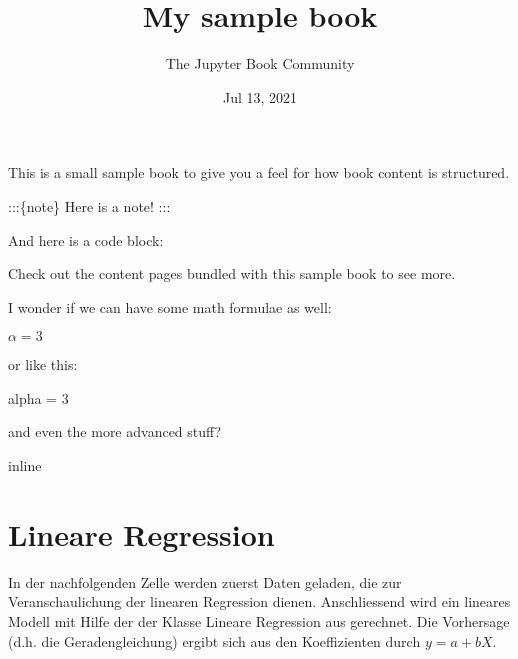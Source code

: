 \documentclass[letterpaper,10pt,english]{jupyterBook}
\title{My sample book}
\date{Jul 13, 2021}
\author{The Jupyter Book Community}
\begin{document}
\pagestyle{empty}
\sphinxmaketitle
\pagestyle{plain}
\sphinxtableofcontents
\pagestyle{normal}
\label{\detokenize{intro::doc}}


\sphinxAtStartPar
This is a small sample book to give you a feel for how book content is
structured.

\sphinxAtStartPar
:::\{note\}
Here is a note!
:::

\sphinxAtStartPar
And here is a code block:

\begin{sphinxVerbatim}[commandchars=\\\{\}]
  
\end{sphinxVerbatim}

\sphinxAtStartPar
Check out the content pages bundled with this sample book to see more.

\sphinxAtStartPar
I wonder if we can have some math formulae as well:

\sphinxAtStartPar
\(\alpha = 3\)

\sphinxAtStartPar
or like this:

\begin{sphinxVerbatim}[commandchars=\\\{\}]
\PYGZdl{}\PYGZbs{}alpha = 3\PYGZdl{}
\end{sphinxVerbatim}

\sphinxAtStartPar
and even the more advanced stuff?

\begin{sphinxVerbatim}[commandchars=\\\{\}]
   
 inline
\end{sphinxVerbatim}


\chapter{Lineare Regression}
\label{\detokenize{Regression_Techniques:lineare-regression}}\label{\detokenize{Regression_Techniques::doc}}
\sphinxAtStartPar
In der nachfolgenden Zelle werden zuerst Daten geladen, die zur Veranschaulichung der linearen Regression dienen.
Anschliessend wird ein lineares Modell mit Hilfe der der Klasse Lineare Regression aus  gerechnet. Die Vorhersage (d.h. die Geradengleichung) ergibt sich aus den Koeffizienten durch \(y = a + bX\).
\end{document}
